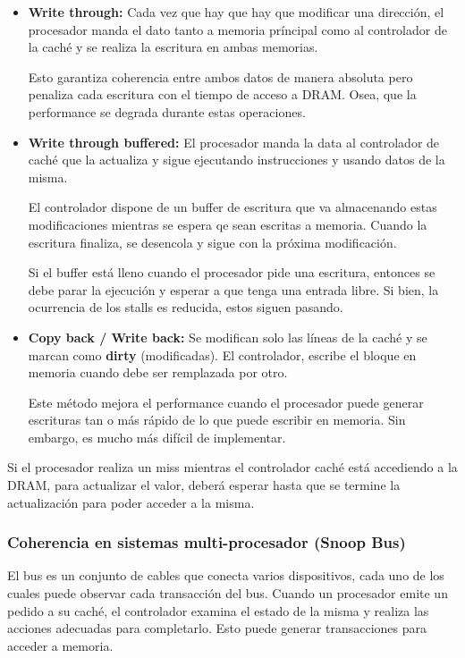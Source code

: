 \begin{itemize}
	\item \textbf{Write through:} Cada vez que hay que hay que modificar una dirección, el procesador manda el dato tanto a memoria príncipal como al controlador de la caché y se realiza la escritura en ambas memorias. 
	
	Esto garantiza coherencia entre ambos datos de manera absoluta pero penaliza cada escritura con el tiempo de acceso a DRAM. Osea, que la performance se degrada durante estas operaciones.
	
	\item \textbf{Write through buffered:} El procesador manda la data al controlador de caché que la actualiza y sigue ejecutando instrucciones y usando datos de la misma.
	
	El controlador dispone de un buffer de escritura que va almacenando estas modificaciones mientras se espera qe sean escritas a memoria. Cuando la escritura finaliza, se desencola y sigue con la próxima modificación.
	
 	Si el buffer está lleno cuando el procesador pide una escritura, entonces se debe parar la ejecución y esperar a que tenga una entrada libre. Si bien, la ocurrencia de los stalls es reducida, estos siguen pasando.
 	
 	\item \textbf{Copy back / Write back:} Se modifican solo las líneas de la caché y se marcan como \textbf{dirty} (modificadas). El controlador, escribe el bloque en memoria cuando debe ser remplazada por otro. 
 	
 	Este método mejora el performance cuando el procesador puede generar escrituras tan o más rápido de lo que puede escribir en memoria. Sin embargo, es mucho más difícil de implementar.
\end{itemize}

Si el procesador realiza un miss mientras el controlador caché está accediendo a la DRAM, para actualizar el valor, deberá esperar hasta que se termine la actualización para poder acceder a la misma.

\subsubsection{Coherencia en sistemas multi-procesador (Snoop Bus)}
El bus es un conjunto de cables que conecta varios dispositivos, cada uno de los cuales puede observar cada transacción del bus. Cuando un procesador emite un pedido a su caché, el controlador examina el estado de la misma y realiza las acciones adecuadas para completarlo. Esto puede generar transacciones para acceder a memoria.

